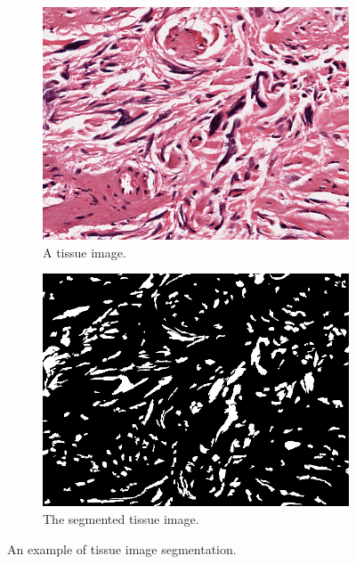 \begin{figure}[t]
   \centering
   \begin{subfigure}[b]{0.45\textwidth}
       \includegraphics[width=\textwidth]{img/image1.png}
       \caption{A tissue image.}
       \label{fig:rg1}
   \end{subfigure}
   \hspace{3mm}
   \begin{subfigure}[b]{0.45\textwidth}
        \includegraphics[width=\textwidth]{img/seg.png}
        \caption{The segmented tissue image.}
        \label{fig:rg2}
    \end{subfigure}
    \caption{An example of tissue image segmentation.}
    \label{fig:tissue}
\end{figure}

